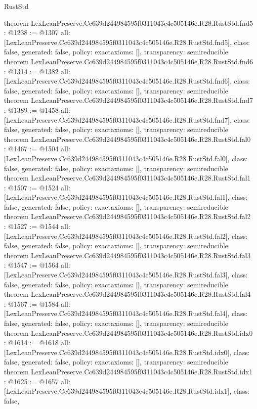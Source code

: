 \begin{lexlean}{RustStd}
\begin{coremodule}
{}
theorem LexLeanPreserve.Cc639d244984595f0311043c4c505146e.R28.RustStd.fnd5 : @1238 := @1307 {
  all: [LexLeanPreserve.Cc639d244984595f0311043c4c505146e.R28.RustStd.fnd5],
  class: false,
  generated: false,
  policy: exact{axioms: []},
  transparency: semireducible
}
theorem LexLeanPreserve.Cc639d244984595f0311043c4c505146e.R28.RustStd.fnd6 : @1314 := @1382 {
  all: [LexLeanPreserve.Cc639d244984595f0311043c4c505146e.R28.RustStd.fnd6],
  class: false,
  generated: false,
  policy: exact{axioms: []},
  transparency: semireducible
}
theorem LexLeanPreserve.Cc639d244984595f0311043c4c505146e.R28.RustStd.fnd7 : @1389 := @1458 {
  all: [LexLeanPreserve.Cc639d244984595f0311043c4c505146e.R28.RustStd.fnd7],
  class: false,
  generated: false,
  policy: exact{axioms: []},
  transparency: semireducible
}
theorem LexLeanPreserve.Cc639d244984595f0311043c4c505146e.R28.RustStd.fal0 : @1467 := @1504 {
  all: [LexLeanPreserve.Cc639d244984595f0311043c4c505146e.R28.RustStd.fal0],
  class: false,
  generated: false,
  policy: exact{axioms: []},
  transparency: semireducible
}
theorem LexLeanPreserve.Cc639d244984595f0311043c4c505146e.R28.RustStd.fal1 : @1507 := @1524 {
  all: [LexLeanPreserve.Cc639d244984595f0311043c4c505146e.R28.RustStd.fal1],
  class: false,
  generated: false,
  policy: exact{axioms: []},
  transparency: semireducible
}
theorem LexLeanPreserve.Cc639d244984595f0311043c4c505146e.R28.RustStd.fal2 : @1527 := @1544 {
  all: [LexLeanPreserve.Cc639d244984595f0311043c4c505146e.R28.RustStd.fal2],
  class: false,
  generated: false,
  policy: exact{axioms: []},
  transparency: semireducible
}
theorem LexLeanPreserve.Cc639d244984595f0311043c4c505146e.R28.RustStd.fal3 : @1547 := @1564 {
  all: [LexLeanPreserve.Cc639d244984595f0311043c4c505146e.R28.RustStd.fal3],
  class: false,
  generated: false,
  policy: exact{axioms: []},
  transparency: semireducible
}
theorem LexLeanPreserve.Cc639d244984595f0311043c4c505146e.R28.RustStd.fal4 : @1567 := @1584 {
  all: [LexLeanPreserve.Cc639d244984595f0311043c4c505146e.R28.RustStd.fal4],
  class: false,
  generated: false,
  policy: exact{axioms: []},
  transparency: semireducible
}
theorem LexLeanPreserve.Cc639d244984595f0311043c4c505146e.R28.RustStd.idx0 : @1614 := @1618 {
  all: [LexLeanPreserve.Cc639d244984595f0311043c4c505146e.R28.RustStd.idx0],
  class: false,
  generated: false,
  policy: exact{axioms: []},
  transparency: semireducible
}
theorem LexLeanPreserve.Cc639d244984595f0311043c4c505146e.R28.RustStd.idx1 : @1625 := @1657 {
  all: [LexLeanPreserve.Cc639d244984595f0311043c4c505146e.R28.RustStd.idx1],
  class: false,
}
\end{coremodule}
\end{lexlean}
